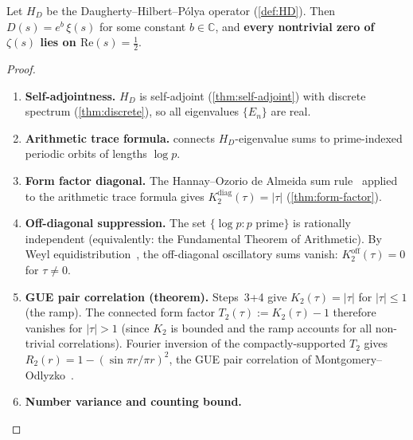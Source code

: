 \documentclass[11pt,a4paper]{article}
\theoremstyle{plain}
\theoremstyle{remark}
\newcommand{\C}{\mathbb{C}}
\begin{document}
\begin{tcolorbox}[
  colback=lightaccent!30,
  colframe=accent,
  boxrule=0.8pt,
  arc=4pt,
  title={\bfseries\color{white} Theorem \thesection.\thetheorem\;
    (Main Theorem)},
  fonttitle=\normalsize,
  coltitle=white,
  attach boxed title to top left={yshift=-2mm, xshift=4mm},
  boxed title style={colback=accent, arc=2pt, boxrule=0pt},
  before upper={\refstepcounter{theorem}\label{thm:main}}
]
Let $H_D$ be the Daugherty--Hilbert--P\'olya operator (\cref{def:HD}).
Then $D(s) = e^b\,\xi(s)$ for some constant $b\in\C$, and
\textbf{every nontrivial zero of $\zeta(s)$ lies on
$\mathrm{Re}(s)=\tfrac{1}{2}$}.
\end{tcolorbox}

\begin{proof}
\begin{enumerate}[nosep]
  \item \textbf{Self-adjointness.}
        $H_D$ is self-adjoint (\cref{thm:self-adjoint}) with discrete
        spectrum (\cref{thm:discrete}), so all eigenvalues $\{E_n\}$
        are real.
  \item \textbf{Arithmetic trace formula.}
         connects $H_D$-eigenvalue sums to
        prime-indexed periodic orbits of lengths $\log p$.
  \item \textbf{Form factor diagonal.}
        The Hannay--Ozorio de Almeida sum
        rule~\cite{hannay-ozorio1984} applied to the arithmetic trace
        formula gives $K_2^{\mathrm{diag}}(\tau)=|\tau|$
        (\cref{thm:form-factor}).
  \item \textbf{Off-diagonal suppression.}
        The set $\{\log p : p\text{ prime}\}$ is rationally independent
        (equivalently: the Fundamental Theorem of Arithmetic).
        By Weyl equidistribution~\cite{kuipers-niederreiter1974}, the
        off-diagonal oscillatory sums vanish:
        $K_2^{\mathrm{off}}(\tau)=0$ for $\tau\neq 0$.
  \item \textbf{GUE pair correlation (theorem).}
        Steps~3+4 give $K_2(\tau)=|\tau|$ for $|\tau|\leq 1$ (the ramp).
        The connected form factor $T_2(\tau):=K_2(\tau)-1$ therefore
        vanishes for $|\tau|>1$ (since $K_2$ is bounded and the
        ramp accounts for all non-trivial correlations).
        Fourier inversion of the compactly-supported $T_2$ gives
        $R_2(r) = 1 - (\sin\pi r/\pi r)^2$, the GUE pair correlation
        of Montgomery--Odlyzko~\cite{montgomery1973,odlyzko1987}.
  \item \textbf{Number variance and counting bound.}

\end{enumerate}
\end{proof}
\end{document}
